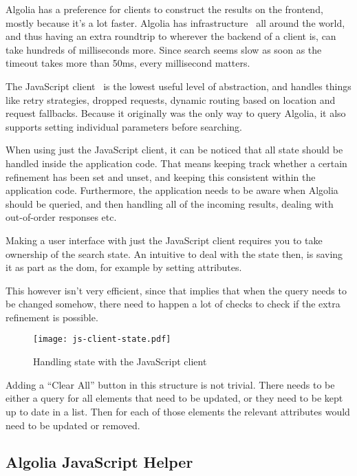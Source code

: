 Algolia has a preference for clients to construct the results on the frontend, mostly because it's a lot faster. Algolia has infrastructure~\cite{algolia-infra} all around the world, and thus having an extra roundtrip to wherever the backend of a client is, can take hundreds of milliseconds more. Since search seems slow as soon as the timeout takes more than 50ms, every millisecond matters.

The JavaScript client~\cite{algolia-js-client} is the lowest useful level of abstraction, and handles things like retry strategies, dropped requests, dynamic routing based on location and request fallbacks. Because it originally was the only way to query Algolia, it also supports setting individual parameters before searching.

When using just the JavaScript client, it can be noticed that all state should be handled inside the application code. That means keeping track whether a certain refinement has been set and unset, and keeping this consistent within the application code. Furthermore, the application needs to be aware when Algolia should be queried, and then handling all of the incoming results, dealing with out-of-order responses etc.

Making a user interface with just the JavaScript client requires you to take ownership of the search state. An intuitive to deal with the state then, is saving it as part as the \acrshort{dom}, for example by setting attributes.

This however isn't very efficient, since that implies that when the query needs to be changed somehow, there need to happen a lot of checks to check if the extra refinement is possible.

\begin{figure}[H]
  \centering
  \texttt{[image: js-client-state.pdf]}
  \caption{Handling state with the JavaScript client}
  \label{figure:js-client-state}
\end{figure}

Adding a ``Clear All'' button in this structure is not trivial. There needs to be either a query for all elements that need to be updated, or they need to be kept up to date in a list. Then for each of those elements the relevant attributes would need to be updated or removed.


\subsection{Algolia JavaScript Helper} %
\label{sub:algolia_js_helper}

